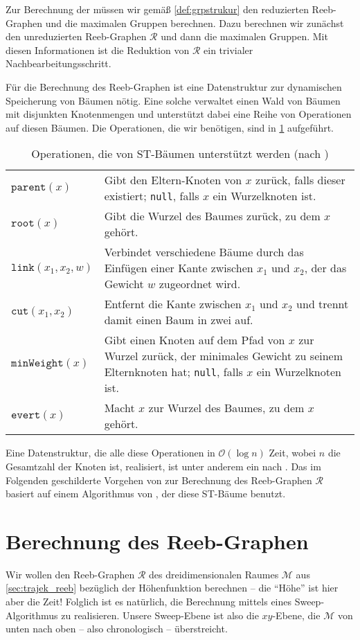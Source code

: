 Zur Berechnung der \GrpStruktur müssen wir gemäß \cref{def:grpstrukur} den reduzierten Reeb-Graphen und die maximalen Gruppen berechnen.
Dazu berechnen wir zunächst den unreduzierten Reeb-Graphen $\mathcal{R}$ und dann die maximalen Gruppen.
Mit diesen Informationen ist die Reduktion von $\mathcal{R}$ ein trivialer Nachbearbeitungsschritt.

Für die Berechnung des Reeb-Graphen ist eine Datenstruktur zur dynamischen Speicherung von Bäumen nötig.
Eine solche verwaltet einen Wald von Bäumen mit disjunkten Knotenmengen und unterstützt dabei eine Reihe von Operationen auf diesen Bäumen.
Die Operationen, die wir benötigen, sind in \cref{tbl:operationenST} aufgeführt.
\begin{table}[p]
	\Centering
	\caption{Operationen, die von ST-Bäumen unterstützt werden (nach \cite{parsaReeb})}\label{tbl:operationenST}
	\begin{tabular}{lp{}}
		\toprule
		$\mathtt{parent}(x)$ & Gibt den Eltern-Knoten von $x$ zurück, falls dieser existiert; \texttt{null}, falls $x$ ein Wurzelknoten ist.\\
		$\mathtt{root}(x)$ & Gibt die Wurzel des Baumes zurück, zu dem $x$ gehört.\\
		$\mathtt{link}(x_1,x_2,w)$ & Verbindet verschiedene Bäume durch das Einfügen einer Kante zwischen $x_1$ und $x_2$, der das Gewicht $w$ zugeordnet wird.\\
		$\mathtt{cut}(x_1,x_2)$ & Entfernt die Kante zwischen $x_1$ und $x_2$ und trennt damit einen Baum in zwei auf.\\
		$\mathtt{minWeight}(x)$ & Gibt einen Knoten auf dem Pfad von $x$ zur Wurzel zurück, der minimales Gewicht zu seinem Elternknoten hat; \texttt{null}, falls $x$ ein Wurzelknoten ist.\\
		$\mathtt{evert}(x)$ & Macht $x$ zur Wurzel des Baumes, zu dem $x$ gehört.\\
		\bottomrule
	\end{tabular}
\end{table}
Eine Datenstruktur, die alle diese Operationen in $\mathcal{O}(\log n)$ Zeit, wobei $n$ die Gesamtzahl der Knoten ist, realisiert, ist unter anderem ein  nach \textcite{dynamictrees}.
Das im Folgenden geschilderte Vorgehen von \textcite{buchin2015} zur Berechnung des Reeb-Graphen $\mathcal{R}$ basiert auf einem Algorithmus von \textcite{parsaReeb}, der diese ST-Bäume benutzt.

\section{Berechnung des Reeb-Graphen} %
\label{sec:berechnung_reeb}
Wir wollen den Reeb-Graphen $\mathcal{R}$ des dreidimensionalen Raumes $\mathcal{M}$ aus \cref{sec:trajek_reeb} bezüglich der Höhenfunktion berechnen -- die \enquote{Höhe} ist hier aber die Zeit!
Folglich ist es natürlich, die Berechnung mittels eines Sweep-Algorithmus zu realisieren.
Unsere Sweep-Ebene ist also die $xy$-Ebene, die $\mathcal{M}$ von unten nach oben -- also chronologisch -- überstreicht.

